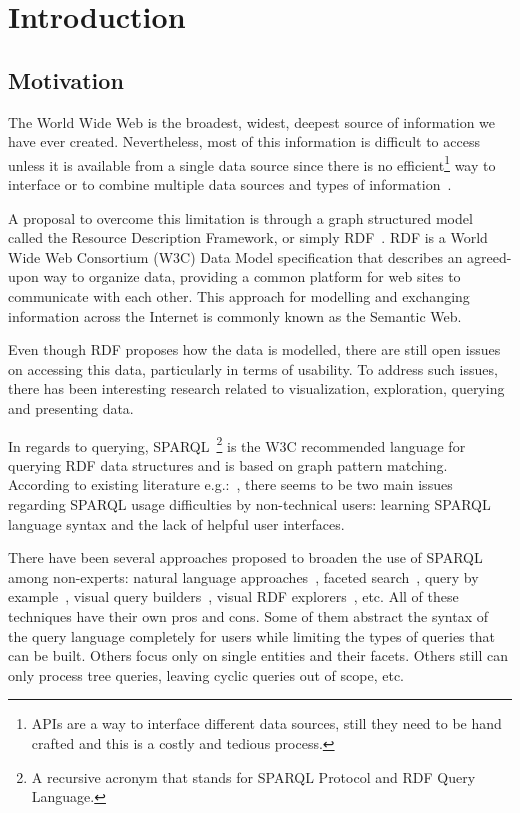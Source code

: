 \chapter{Introduction}

\section{Motivation}
\label{chap:motivation}

The World Wide Web is the broadest, widest, deepest source of information we have ever created. 
Nevertheless, most of this information is difficult to access unless it is available from a single data source since there is no efficient\footnote{APIs are a way to interface different data sources, 
still they need to be hand crafted and this is a costly and tedious process.} way to interface or to combine multiple data sources and types of information~\cite{W3CDesignIssues}.

A proposal to overcome this limitation is through a graph structured model called the Resource Description Framework, or simply RDF~\cite{rdfprimer11}. 
RDF is a World Wide Web Consortium (W3C) Data Model specification that describes an agreed-upon way to organize data, 
providing a common platform for web sites to communicate with each other. 
This approach for modelling and exchanging information across the Internet is commonly known as the Semantic Web.

Even though RDF proposes how the data is modelled, there are still open issues on accessing this data, particularly in terms of usability. 
To address such issues, there has been interesting research related to visualization, exploration, querying and presenting data.

In regards to querying, SPARQL~\cite{SPARQL}\footnote{A recursive acronym that stands for SPARQL Protocol and RDF Query Language.} is the W3C recommended language for querying RDF data structures and is based on graph pattern matching. According to existing literature e.g.:~\cite{Ferre2016, Lehmann2014, Unger2014}, there seems to be two main issues regarding SPARQL usage difficulties by non-technical users: learning SPARQL language syntax and the lack of helpful user interfaces.

There have been several approaches proposed to broaden the use of SPARQL among non-experts: 
natural language approaches~\cite{Ngomo2013, Lehmann2013, Rico2015, Ngomo2019}, faceted search~\cite{Arenas2016, Moreno2018}, 
query by example~\cite{Clemmer2011, Diaz2016}, 
visual query builders~\cite{Dadzie2011, Vargas2019}, visual RDF explorers~\cite{Bikakis2016, Rietveld2016}, etc. 
All of these techniques have their own pros and cons. 
Some of them abstract the syntax of the query language completely for users while limiting the types of queries that can be built. 
Others focus only on single entities and their facets. 
Others still can only process tree queries, leaving cyclic queries out of scope, etc. 

